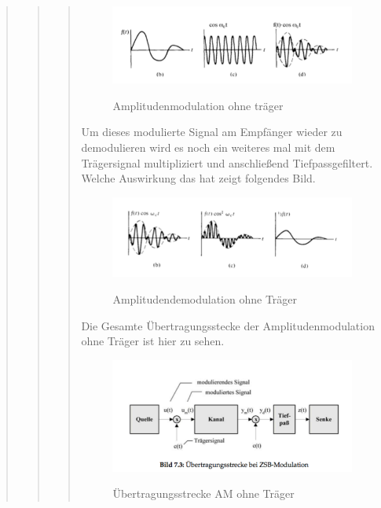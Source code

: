 \begin{quote}
\begin{quote}
\begin{quote}
            \begin{figure}[H]
            \centering
                \includegraphics[scale=0.7, trim = 0cm 0cm 0cm 0cm, clip]{./Bilder/AMohneTraeger}
                    \caption{Amplitudenmodulation ohne träger}
                    \label{fig:AMohneTraeger}
                    \cite{AMohnetraeger}
            \end{figure}
    
            Um dieses modulierte Signal am Empfänger wieder zu demodulieren wird es noch ein weiteres mal mit dem
            Trägersignal multipliziert und anschließend Tiefpassgefiltert. Welche Auswirkung das hat zeigt folgendes
            Bild.
            
            \begin{figure}[H]
            \centering
                \includegraphics[scale=0.7, trim = 0cm 0cm 0cm 0cm, clip]{./Bilder/AMohnetraegerdemodulation}
                    \caption{Amplitudendemodulation ohne Träger}
                    \cite{AMdemodulation}
            \end{figure}
    
            Die Gesamte Übertragungsstecke der Amplitudenmodulation ohne Träger ist hier zu sehen.
            
            \begin{figure}[H]
            \centering
                \includegraphics[scale=0.7, trim = 0cm 0cm 0cm 0cm, clip]{./Bilder/uebertragungsstreckeAMohnetraeger}
                    \caption{Übertragungsstrecke AM ohne Träger}
                    \cite{AMohneUeber}
            \end{figure}
             

\end{quote}
\end{quote}
\end{quote}
